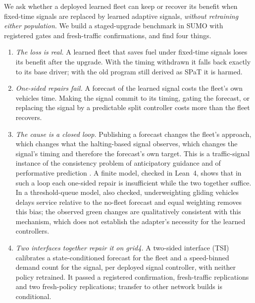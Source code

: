 We ask whether a deployed learned fleet can keep or recover its benefit when fixed-time signals are replaced by learned adaptive signals,
\emph{without retraining either population}. We build a staged-upgrade benchmark in SUMO \cite{lopez2018} with registered gates and
fresh-traffic confirmations, and find four things.
\begin{enumerate}\setlength\itemsep{1pt}
\item \emph{The loss is real.} A learned fleet that saves fuel under fixed-time signals loses its benefit after the upgrade. With the
timing withdrawn it falls back exactly to its base driver; with the old program still derived as SPaT it is harmed.
\item \emph{One-sided repairs fail.} A forecast of the learned signal costs the fleet's own vehicles time. Making the signal commit to
its timing, gating the forecast, or replacing the signal by a predictable split controller costs more than the fleet recovers.
\item \emph{The cause is a closed loop.} Publishing a forecast changes the fleet's approach, which changes what the halting-based signal
observes, which changes the signal's timing and therefore the forecast's own target. This is a traffic-signal instance of the consistency
problem of anticipatory guidance \cite{bottom2000} and of performative prediction \cite{perdomo2020,narang2023}. A finite model, checked
in Lean~4, shows that in such a loop each one-sided repair is insufficient while the two together suffice. In a threshold-queue model, also checked, underweighting gliding vehicles delays service relative to the no-fleet forecast and equal weighting removes this bias; the observed green changes are qualitatively consistent with this mechanism, which does not establish the adapter's necessity for the learned controllers.
\item \emph{Two interfaces together repair it on grid4.} A two-sided interface (TSI) calibrates a state-conditioned forecast for
the fleet and a speed-binned demand count for the signal, per deployed signal controller, with neither policy retrained. It passed a
registered confirmation, fresh-traffic replications and two fresh-policy replications; transfer to other network builds is conditional.
\end{enumerate}

